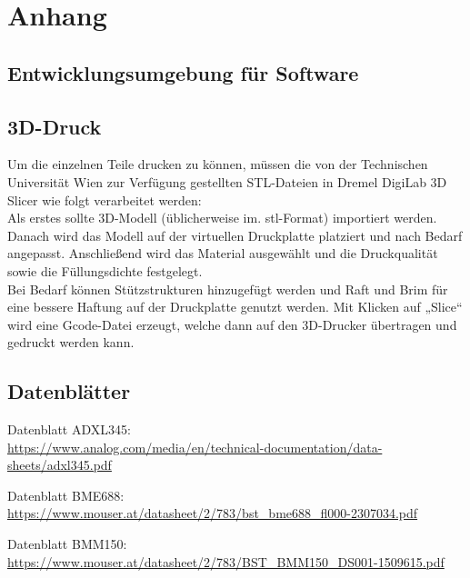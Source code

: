\section{Anhang}

\newpage
\subsection{Entwicklungsumgebung für Software}
\SecAuth{\nameJS \nameSH \nameCZ}


\SecAuth{\nameSH \nameCZ \nameSB \nameJS}
\subsection{3D-Druck}
Um die einzelnen Teile drucken zu können, müssen die von der Technischen Universität Wien zur Verfügung gestellten STL-Dateien in Dremel DigiLab 3D Slicer wie folgt verarbeitet werden:\\
\vspace{3mm}
Als erstes sollte 3D-Modell (üblicherweise im. stl-Format) importiert werden. Danach wird das Modell auf der virtuellen Druckplatte platziert und nach Bedarf angepasst. Anschließend wird das Material ausgewählt und die Druckqualität sowie die Füllungsdichte festgelegt.\\
\vspace{3mm}
Bei Bedarf können Stützstrukturen hinzugefügt werden und Raft und Brim für eine bessere Haftung auf der Druckplatte genutzt werden. Mit Klicken auf „Slice“ wird eine Gcode-Datei erzeugt, welche dann auf den 3D-Drucker übertragen und gedruckt werden kann.

\subsection{Datenblätter}
Datenblatt ADXL345:\\
\url{https://www.analog.com/media/en/technical-documentation/data-sheets/adxl345.pdf}\\
\vspace{3mm}

Datenblatt BME688:\\
\url{https://www.mouser.at/datasheet/2/783/bst_bme688_fl000-2307034.pdf}\\
\vspace{3mm}

Datenblatt BMM150:\\
\url{https://www.mouser.at/datasheet/2/783/BST_BMM150_DS001-1509615.pdf}\\
\vspace{3mm}

